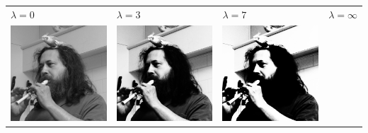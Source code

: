 \begin{tabular}{llll}
	$\lambda=0$ &
	$\lambda=3$ &
	$\lambda=7$ &
	$\lambda=\infty$ \\
	\includegraphics{weiro-tanh0.png} &
	\includegraphics{weiro-tanh3.png} &
	\includegraphics{weiro-tanh7.png} &

\end{tabular}
